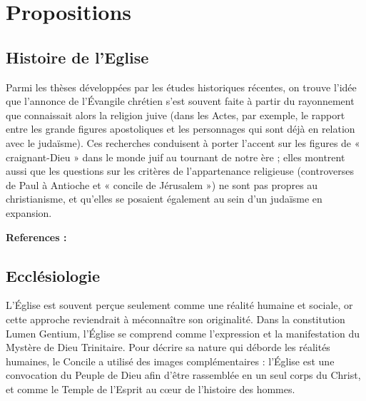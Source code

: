 % 
\newenvironment{references}%
{\begin{hangparas}{.25in}{0}
	\footnotesize
	\textbf{References :\\}
	\footnotesize
}
{\end{hangparas}}


\section{Propositions}

\subsection{Histoire de l’Eglise}

Parmi les thèses développées par les études historiques récentes, on trouve l'idée que l'annonce de l’Évangile chrétien s'est souvent faite à partir du rayonnement que connaissait alors la religion juive (dans les Actes, par exemple, le rapport entre les grande figures apostoliques et les personnages qui sont déjà en relation avec le judaïsme). Ces recherches conduisent à porter l'accent sur les figures de « craignant-Dieu » dans le monde juif au tournant de notre ère ; elles montrent aussi que les questions sur les critères de l'appartenance religieuse (controverses de Paul à Antioche et « concile de Jérusalem ») ne sont pas propres au christianisme, et qu'elles se posaient également au sein d'un judaïsme en expansion.\\

	\begin{references}


	\end{references}

\subsection{Ecclésiologie} 

L’Église est souvent perçue seulement comme une réalité humaine et sociale, or cette approche reviendrait à méconnaître son originalité. Dans la constitution Lumen Gentium, l’Église se comprend comme l’expression et la manifestation du Mystère de Dieu Trinitaire. Pour décrire sa nature qui déborde les réalités humaines, le Concile a utilisé des images complémentaires : l’Église est une convocation du Peuple de Dieu afin d’être rassemblée en un seul corps du Christ, et comme le Temple de l’Esprit au cœur de l’histoire des hommes. \\

